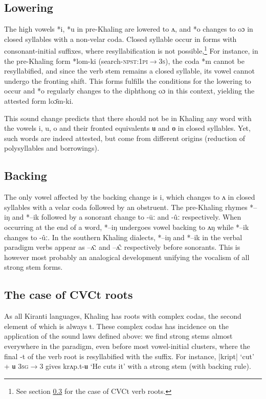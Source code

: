 \documentclass[oldfontcommands,oneside,a4paper,11pt]{article}
\newcommand{\ipa}[1]{{\phon \mbox{#1}}} %
\begin{document}
\subsection{Lowering} \label{sec:lowering}
The high vowels \ipa{*i}, \ipa{*u}   in pre-Khaling are lowered to \ipa{ʌ},  and   \ipa{*o} changes to \ipa{oɔ} in closed syllables with a non-velar coda. Closed syllable occur in forms with consonant-initial suffixes, where resyllabification is not possible,\footnote{See section \ref{sec:cvct} for the case of CVCt verb roots.} For instance, in the pre-Khaling form \ipa{*lom-ki} (search-\textsc{npst:1pi$\rightarrow$3s}), the coda \ipa{*m} cannot be resyllabified, and since the verb stem remains a closed syllable, its vowel cannot undergo the fronting shift. This forms fulfills the conditions for the lowering to occur and \ipa{*o} regularly changes to the diphthong \ipa{oɔ} in this context, yielding the attested form \ipa{loɔ̄m-ki}.


This sound change predicts that there should not be in Khaling any word with the vowels \ipa{i}, \ipa{u}, \ipa{o} and their fronted equivalents \ipa{ʉ} and \ipa{ɵ} in closed syllables. Yet, such words are indeed attested, but come from different origins (reduction of polysyllables and borrowings).

\subsection{Backing} \label{sec:backing}
The only vowel affected by the backing change is \ipa{i}, which changes to \ipa{ʌ} in closed syllables with a velar coda followed by an obstruent. The pre-Khaling rhymes \ipa{*--iŋ} and \ipa{*--ik}  followed by a sonorant change to \ipa{-ūː} and \ipa{-ûː} respectively. When occurring at the end of a word, \ipa{*--iŋ} undergoes vowel backing to \ipa{ʌŋ} while \ipa{*--ik}  changes to \ipa{-ûː}. In the southern Khaling dialects,  \ipa{*--iŋ} and \ipa{*--ik} in the verbal paradigm verbs appear as \ipa{--ʌ̄ː} and  \ipa{--ʌ̂ː} respectively before sonorants. This is however most probably an analogical development unifying the vocalism of all strong stem forms.


\subsection{The case of CVCt roots} \label{sec:cvct}
As all Kiranti languages, Khaling has roots with complex codas, the second element of which is always \ipa{t}. These complex codas has incidence on the application of the sound laws defined above: we find strong stems almost everywhere in the paradigm, even before most vowel-initial clusters, where the final \ipa{-t} of the verb root is resyllabified with the suffix. For instance,  |kript| `cut' + \ipa{ʉ} \textsc{3sg$\rightarrow$3} gives \ipa{krʌp.t-ʉ} `He cuts it' with a strong stem (with backing rule).
\end{document}
